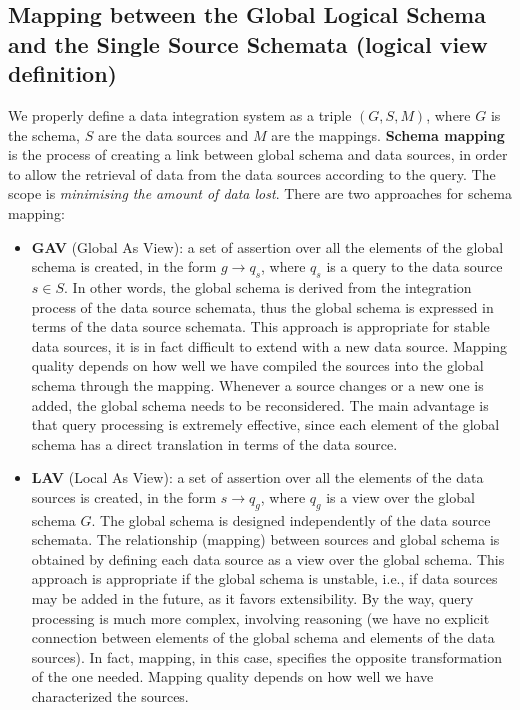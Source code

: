 \documentclass[10pt,a4paper]{article}
\begin{document}
\subsection{Mapping between the Global Logical Schema and the Single Source Schemata (logical view definition)}
\begin{justify}
We properly define a data integration system as a triple \boldmath$(G,S,M)$, where $G$ is the schema, $S$ are the data sources and $M$ are the mappings. \textbf{Schema mapping} is the process of creating a link between global schema and data sources, in order to allow the retrieval of data from the data sources according to the query. The scope is \textit{minimising the amount of data lost}. There are two approaches for schema mapping:
\begin{itemize}
	\item \textbf{GAV} (Global As View): a set of assertion over all the elements of the global schema is created, in the form $g\rightarrow{q_s}$, where $q_s$ is a query to the data source $s\in{S}$. In other words, the global schema is derived from the integration process of the data source schemata, thus the global schema is expressed in terms of the data source schemata. This approach is appropriate for stable data sources, it is in fact difficult to extend with a new data source. Mapping quality depends on how well we have compiled the sources into the global schema through the mapping. Whenever a source changes or a new one is added, the global schema needs to be reconsidered. The main advantage is that query processing is extremely effective, since each element of the global schema has a direct translation in terms of the data source. 
	\item \textbf{LAV} (Local As View): a set of assertion over all the elements of the data sources is created, in the form $s\rightarrow{q_g}$, where $q_g$ is a view over the global schema $G$. The global schema is designed independently of the data source schemata. The relationship (mapping) between sources and global schema is obtained by defining each data source as a view over the global schema. This approach is appropriate if the global schema is unstable, i.e., if data sources may be added in the future, as it favors extensibility. By the way, query processing is much more complex, involving reasoning (we have no explicit connection between elements of the global schema and elements of the data sources). In fact, mapping, in this case, specifies the opposite transformation of the one needed. Mapping quality depends on how well we have characterized the sources. 

\end{itemize}
\end{justify}
\end{document}

